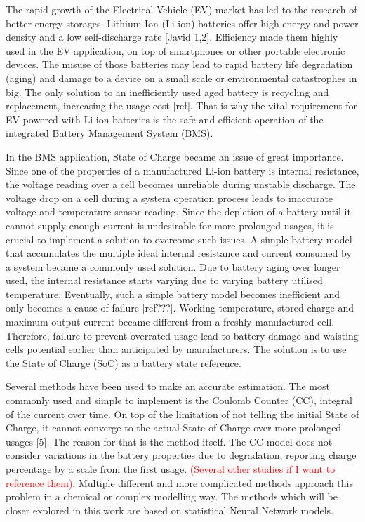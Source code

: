 The rapid growth of the Electrical Vehicle (EV) market has led to the research of better energy storages.
Lithium-Ion (Li-ion) batteries offer high energy and power density and a low self-discharge rate [Javid 1,2].
Efficiency made them highly used in the EV application, on top of smartphones or other portable electronic devices.
The misuse of those batteries may lead to rapid battery life degradation (aging) and damage to a device on a small scale or environmental catastrophes in big.
The only solution to an inefficiently used aged battery is recycling and replacement, increasing the usage cost [ref].
That is why the vital requirement for EV powered with Li-ion batteries is the safe and efficient operation of the integrated Battery Management System (BMS).

%
%
In the BMS application, State of Charge became an issue of great importance.
Since one of the properties of a manufactured Li-ion battery is internal resistance, the voltage reading over a cell becomes unreliable during unstable discharge.
The voltage drop on a cell during a system operation process leads to inaccurate voltage and temperature sensor reading.
Since the depletion of a battery until it cannot supply enough current is undesirable for more prolonged usages, it is crucial to implement a solution to overcome such issues.
A simple battery model that accumulates the multiple ideal internal resistance and current consumed by a system became a commonly used solution.
Due to battery aging over longer used, the internal resistance starts varying due to varying battery utilised temperature.
Eventually, such a simple battery model becomes inefficient and only becomes a cause of failure [ref???].
Working temperature, stored charge and maximum output current became different from a freshly manufactured cell.
Therefore, failure to prevent overrated usage lead to battery damage and waisting cells potential earlier than anticipated by manufacturers.
The solution is to use the State of Charge (SoC) as a battery state reference.

%
%
Several methods have been used to make an accurate estimation.
The most commonly used and simple to implement is the Coulomb Counter (CC), integral of the current over time.
On top of the limitation of not telling the initial State of Charge, it cannot converge to the actual State of Charge over more prolonged usages [5].
The reason for that is the method itself.
The CC model does not consider variations in the battery properties due to degradation, reporting charge percentage by a scale from the first usage.
\textcolor{red}{(Several other studies if I want to reference them).}
Multiple different and more complicated methods approach this problem in a chemical or complex modelling way.
The methods which will be closer explored in this work are based on statistical Neural Network models.

